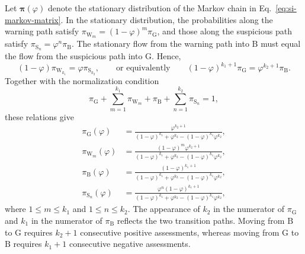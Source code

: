 \documentclass[fleqn,10pt]{wlscirep}
\begin{document}
Let $\boldsymbol\pi(\varphi)$ denote the stationary distribution of the Markov chain in Eq.~\eqref{eq:si-markov-matrix}. In the stationary distribution, the probabilities along the warning path satisfy $\pi_{\mathrm{W}_m}=(1-\varphi)^m\pi_{\mathrm{G}}$, and those along the suspicious path satisfy $\pi_{\mathrm{S}_n}=\varphi^n\pi_{\mathrm{B}}$. The stationary flow from the warning path into $\mathrm{B}$ must equal the flow from the suspicious path into $\mathrm{G}$. Hence,
\[
(1-\varphi)\pi_{\mathrm{W}_{k_1}}=\varphi\pi_{\mathrm{S}_{k_2}},
\qquad\text{or equivalently}\qquad
(1-\varphi)^{k_1+1}\pi_{\mathrm{G}}=\varphi^{k_2+1}\pi_{\mathrm{B}}.
\]
Together with the normalization condition
\[
\pi_{\mathrm{G}}+\sum_{m=1}^{k_1}\pi_{\mathrm{W}_m}+\pi_{\mathrm{B}}+\sum_{n=1}^{k_2}\pi_{\mathrm{S}_n}=1,
\]
these relations give
\begin{equation}
\begin{aligned}
\pi_{\mathrm{G}}(\varphi)
&=\frac{\varphi^{k_2+1}}
{(1-\varphi)^{k_1}+\varphi^{k_2}-(1-\varphi)^{k_1}\varphi^{k_2}},\\
\pi_{\mathrm{W}_m}(\varphi)
&=\frac{(1-\varphi)^m\varphi^{k_2+1}}
{(1-\varphi)^{k_1}+\varphi^{k_2}-(1-\varphi)^{k_1}\varphi^{k_2}},\\
\pi_{\mathrm{B}}(\varphi)
&=\frac{(1-\varphi)^{k_1+1}}
{(1-\varphi)^{k_1}+\varphi^{k_2}-(1-\varphi)^{k_1}\varphi^{k_2}},\\
\pi_{\mathrm{S}_n}(\varphi)
&=\frac{\varphi^n(1-\varphi)^{k_1+1}}
{(1-\varphi)^{k_1}+\varphi^{k_2}-(1-\varphi)^{k_1}\varphi^{k_2}},
\end{aligned}
\label{eq:si-stationary-distribution}
\end{equation}
where $1\leq m\leq k_1$ and $1\leq n\leq k_2$. The appearance of $k_2$ in the numerator of $\pi_{\mathrm{G}}$ and $k_1$ in the numerator of $\pi_{\mathrm{B}}$ reflects the two transition paths. Moving from $\mathrm{B}$ to $\mathrm{G}$ requires $k_2+1$ consecutive positive assessments, whereas moving from $\mathrm{G}$ to $\mathrm{B}$ requires $k_1+1$ consecutive negative assessments.
\end{document}
